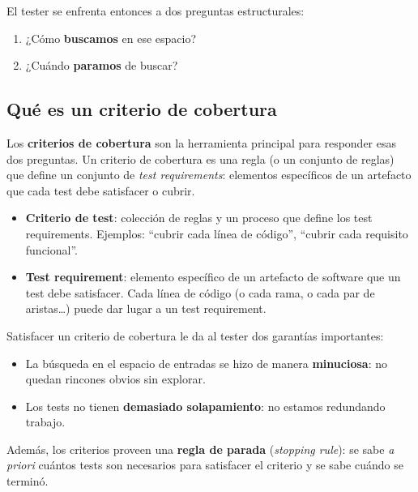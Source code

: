 \documentclass[12pt,a4paper]{article}
\begin{document}
El tester se enfrenta entonces a dos preguntas estructurales:
\begin{enumerate}
  \item ¿Cómo \textbf{buscamos} en ese espacio?
  \item ¿Cuándo \textbf{paramos} de buscar?
\end{enumerate}

\subsection{Qué es un criterio de cobertura}
Los \textbf{criterios de cobertura} son la herramienta principal para responder esas dos preguntas. Un criterio de cobertura es una regla (o un conjunto de reglas) que define un conjunto de \textit{test requirements}: elementos específicos de un artefacto que cada test debe satisfacer o cubrir.

\begin{itemize}
  \item \textbf{Criterio de test}: colección de reglas y un proceso que define los test requirements. Ejemplos: ``cubrir cada línea de código'', ``cubrir cada requisito funcional''.
  \item \textbf{Test requirement}: elemento específico de un artefacto de software que un test debe satisfacer. Cada línea de código (o cada rama, o cada par de aristas\ldots) puede dar lugar a un test requirement.
\end{itemize}

Satisfacer un criterio de cobertura le da al tester dos garantías importantes:
\begin{itemize}
  \item La búsqueda en el espacio de entradas se hizo de manera \textbf{minuciosa}: no quedan rincones obvios sin explorar.
  \item Los tests no tienen \textbf{demasiado solapamiento}: no estamos redundando trabajo.
\end{itemize}

Además, los criterios proveen una \textbf{regla de parada} (\textit{stopping rule}): se sabe \textit{a priori} cuántos tests son necesarios para satisfacer el criterio y se sabe cuándo se terminó.
\end{document}
